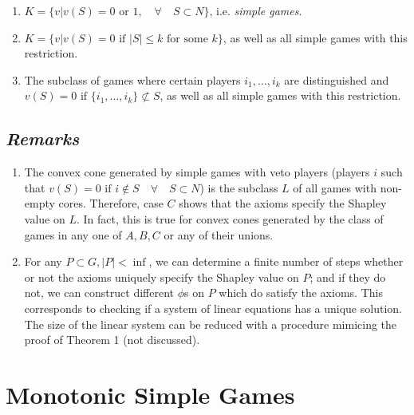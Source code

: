 \documentclass[
paper=128mm:96mm, %
fontsize=11pt, %
pagesize, %
parskip=half-, %
]{scrartcl} %
\theoremstyle{mythmstyle} %
\begin{document}
\begin{enumerate}
\item $K = \{v | v(S) = 0 \text{ or } 1, \quad \forall \quad S \subset N\}$, i.e. \emph{simple games}.

\item $K = \{v | v(S) = 0 \text{ if } |S| \le k \text{ for some } k\}$, as well as all simple games with this restriction.

\item The subclass of games where certain players $i_{1}, \dots, i_{k}$ are distinguished and $v(S) = 0 \text{ if } \{i_{1}, \dots, i_{k}\} \not\subset S$, as well as all simple games with this restriction.
\end{enumerate}

\clearpage

\subsection{\emph{Remarks}}

\begin{enumerate}
\item The convex cone generated by simple games with veto players (players $i$ such that $v(S) = 0 \text{ if } i \not\in S \quad \forall \quad S \subset N$) is the subclass $L$ of all games with non-empty cores. Therefore, case $C$ shows that the axioms specify the Shapley value on $L$. In fact, this is true for convex cones generated by the class of games in any one of $A, B, C$ or any of their unions.

\item For any $P \subset G, |P| < \inf$, we can determine a finite number of steps whether or not the axioms uniquely specify the Shapley value on $P$; and if they do not, we can construct different $\phi$s on $P$ which do satisfy the axioms. This corresponds to checking if a system of linear equations has a unique solution. The size of the linear system can be reduced with a procedure mimicing the proof of Theorem 1 (not discussed).
\end{enumerate}

\clearpage


\section{Monotonic Simple Games}
\end{document}
